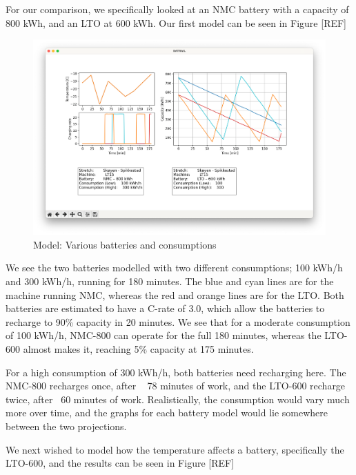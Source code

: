 \documentclass{article}
\begin{document}
For our comparison, we specifically looked at an NMC battery with a capacity of 800 kWh, and an LTO at 600 kWh. Our first model can be seen in Figure [REF]


\begin{figure}[H]
    \centering
    \includegraphics*[width=1\textwidth]{img/image7.png}
    \caption{Model: Various batteries and consumptions}
\end{figure}

We see the two batteries modelled with two different consumptions; 100 kWh/h and 300 kWh/h, running for 180 minutes. The blue and cyan lines are for the machine running NMC, whereas the red and orange lines are for the LTO. Both batteries are estimated to have a C-rate of 3.0, which allow the batteries to recharge to 90\% capacity in 20 minutes. We see that for a moderate consumption of 100 kWh/h, NMC-800 can operate for the full 180 minutes, whereas the LTO-600 almost makes it, reaching 5\% capacity at 175 minutes.

For a high consumption of 300 kWh/h, both batteries need recharging here. The NMC-800 recharges once, after ~ 78 minutes of work, and the LTO-600 recharge twice, after ~60 minutes of work. Realistically, the consumption would vary much more over time, and the graphs for each battery model would lie somewhere between the two projections.

We next wished to model how the temperature affects a battery, specifically the LTO-600, and the results can be seen in Figure [REF]
\end{document}
